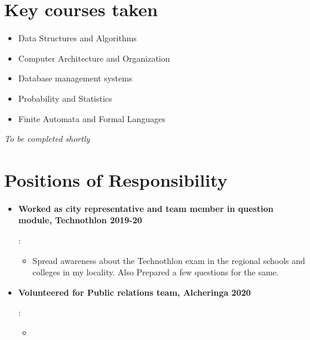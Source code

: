 \documentclass[a4paper,10pt]{report}
\newcommand{\resumeItem}[2]{
  \item\small{
    \textbf{#1}{: #2 \vspace{-2pt}}
  }
}
\newcommand{\resumeSubItem}[2]{\resumeItem{#1}{#2}\vspace{-4pt}}
\newcommand{\resumeSubHeadingListStart}{\begin{itemize}[leftmargin=*]}
\newcommand{\resumeSubHeadingListEnd}{\end{itemize}}
\begin{document}
 
 \vspace{1pt}
 
 
 \section{Key courses taken}
\vspace{-2pt}
 \begin{multicols}{2}
 \begin{itemize}[leftmargin = *,itemsep=-3pt]

\item Data Structures and Algorithms
\item Computer Architecture and Organization
\item Database management systems
\item Probability and Statistics
\item Finite Automata and Formal Languages

 \end{itemize}
 \end{multicols}
 \hfill * \textit{To be completed shortly}
 
 
 \vspace{4pt}


\section{Positions of Responsibility}
\resumeSubHeadingListStart

\resumeSubItem{Worked as city representative and team member in question module, Technothlon 2019-20}
{\vspace{-7pt}
\begin{itemize}
\item Spread awareness about the Technothlon exam in the regional schools and colleges in my locality. Also Prepared a few questions for the same.
\end{itemize} }

\resumeSubItem{Volunteered for Public relations team, Alcheringa 2020}
{\vspace{-7pt}
\begin{itemize}
\item 
\end{itemize} }


\vspace{-2pt}
\resumeSubHeadingListEnd
\end{document}
